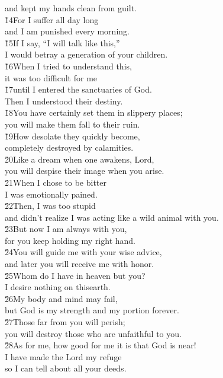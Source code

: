 \begin{poetry}
\poemll    and kept my hands clean from guilt. \\
\poeml \v{14}For I suffer all day long \\
\poemll    and I am punished every morning. \\
\poeml \v{15}If I say, ``I will talk like this,'' \\
\poemll    I would betray a generation of your children. \\
\poeml \v{16}When I tried to understand this, \\
\poemll    it was too difficult for me \\
\poeml \v{17}until I entered the sanctuaries of God. \\
\poemll    Then I understood their destiny. \\
\poeml \v{18}You have certainly set them in slippery places; \\
\poemll    you will make them fall to their ruin. \\
\poeml \v{19}How desolate they quickly become, \\
\poemll    completely destroyed by calamities. \\
\poeml \v{20}Like a dream when one awakens, Lord, \\
\poemll    you will despise their image when you arise. \\
\poeml \v{21}When I chose to be bitter \\
\poemll    I was emotionally pained. \\
\poeml \v{22}Then, I was too stupid \\
\poemll    and didn't realize I was acting like a wild animal with you. \\
\poeml \v{23}But now I am always with you, \\
\poemll    for you keep holding my right hand. \\
\poeml \v{24}You will guide me with your wise advice, \\
\poemll    and later you will receive me with honor. \\
\poeml \v{25}Whom do I have in heaven but you? \\
\poemll    I desire nothing on thisearth. \\
\poeml \v{26}My body and mind may fail, \\
\poemll    but God is my strength and my portion forever. \\
\poeml \v{27}Those far from you will perish; \\
\poemll    you will destroy those who are unfaithful to you. \\
\poeml \v{28}As for me, how good for me it is that God is near! \\
\poemll    I have made the Lord  my refuge \\
\poemlll       so I can tell about all your deeds.
\end{poetry}

